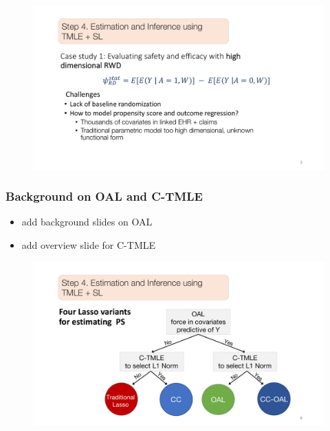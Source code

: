 \documentclass[t]{beamer}
\begin{document}
\begin{frame}
\centering
\begin{figure}
\begin{center}
\includegraphics[width=1.02\textwidth]{figures/abbviepdfslides_3.pdf}
\end{center}
\end{figure}
\end{frame}

\begin{frame}
\frametitle{Background on OAL and C-TMLE}
\begin{itemize}
  \item add background slides on OAL 
  \item add overview slide for C-TMLE
\end{itemize}
\end{frame}

\begin{frame}
\centering
\begin{figure}
\begin{center}
\includegraphics[width=1.02\textwidth]{figures/abbviepdfslides_6.pdf}
\end{center}
\end{figure}
\end{frame}
\end{document}
